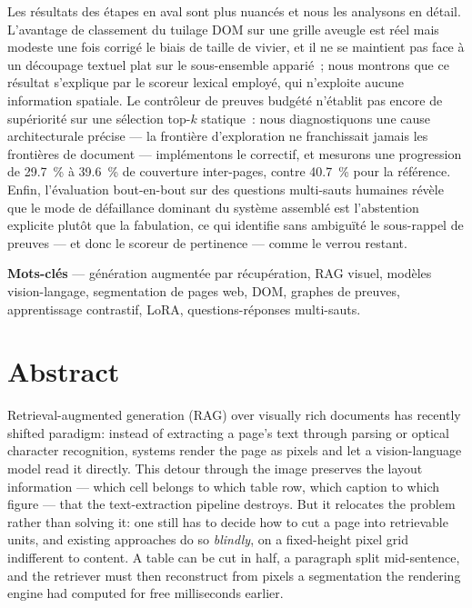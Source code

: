 Les résultats des étapes en aval sont plus nuancés et nous les analysons en
détail. L'avantage de classement du tuilage DOM sur une grille aveugle est réel
mais modeste une fois corrigé le biais de taille de vivier, et il ne se
maintient pas face à un découpage textuel plat sur le sous-ensemble apparié~;
nous montrons que ce résultat s'explique par le scoreur lexical employé, qui
n'exploite aucune information spatiale. Le contrôleur de preuves budgété
n'établit pas encore de supériorité sur une sélection top-$k$ statique~: nous
diagnostiquons une cause architecturale précise --- la frontière d'exploration
ne franchissait jamais les frontières de document --- implémentons le correctif,
et mesurons une progression de \SI{29.7}{\percent} à \SI{39.6}{\percent} de
couverture inter-pages, contre \SI{40.7}{\percent} pour la référence. Enfin,
l'évaluation bout-en-bout sur des questions multi-sauts humaines révèle que le
mode de défaillance dominant du système assemblé est l'abstention explicite
plutôt que la fabulation, ce qui identifie sans ambiguïté le sous-rappel de
preuves --- et donc le scoreur de pertinence --- comme le verrou restant.

\vspace{0.6em}
\noindent\textbf{Mots-clés} --- génération augmentée par récupération, RAG
visuel, modèles vision-langage, segmentation de pages web, DOM, graphes de
preuves, apprentissage contrastif, LoRA, questions-réponses multi-sauts.

\cleardoublepage
\chapter*{Abstract}

Retrieval-augmented generation (RAG) over visually rich documents has recently
shifted paradigm: instead of extracting a page's text through parsing or
optical character recognition, systems render the page as pixels and let a
vision-language model read it directly. This detour through the image preserves
the layout information --- which cell belongs to which table row, which caption
to which figure --- that the text-extraction pipeline destroys. But it relocates
the problem rather than solving it: one still has to decide how to cut a page
into retrievable units, and existing approaches do so \emph{blindly}, on a
fixed-height pixel grid indifferent to content. A table can be cut in half, a
paragraph split mid-sentence, and the retriever must then reconstruct from
pixels a segmentation the rendering engine had computed for free milliseconds
earlier.

